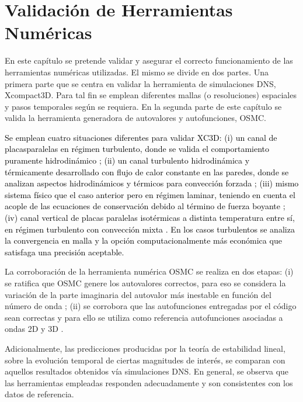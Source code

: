 \chapter{Validación de Herramientas Numéricas} \label{cap:validacion}


En este capítulo se pretende validar y asegurar el correcto funcionamiento de las \linebreak herramientas numéricas utilizadas. El mismo se divide en dos partes. Una primera parte que se centra en validar la herramienta de simulaciones DNS, Xcompact3D. Para tal fin se emplean diferentes mallas (o resoluciones) espaciales y pasos temporales según se requiera. En la segunda parte de este capítulo se valida la herramienta generadora de autovalores y autofunciones, OSMC. 

\textcolor{black}{Se emplean cuatro situaciones diferentes para validar XC3D: (i) un canal de placas\linebreak paralelas en régimen turbulento, donde se valida el comportamiento puramente hidrodinámico \cite{moser1999}; (ii) un canal turbulento hidrodinámica y térmicamente desarrollado con flujo de calor constante en las paredes, donde se analizan aspectos hidrodinámicos y térmicos para convección forzada \cite{kawamura2000dns}; (iii) mismo sistema físico que el caso anterior pero en régimen laminar, teniendo en cuenta el acople de las ecuaciones de conservación debido al término de fuerza boyante \cite{chen1996linear}; (iv) canal vertical de placas paralelas isotérmicas a distinta temperatura entre sí, en régimen  turbulento con convección mixta \cite{guo2022direct}. En los casos turbulentos se analiza la convergencia en malla y la opción computacionalmente más económica que satisfaga una precisión aceptable.}

La corroboración de la herramienta numérica OSMC se realiza en dos etapas: (i) se ratifica que OSMC genere los autovalores correctos, para eso se considera la variación de la parte \linebreak imaginaria del autovalor más inestable en función del número de onda \cite{chen1996linear}; (ii) se corrobora que las autofunciones entregadas por el código sean correctas y para ello se utiliza como referencia autofunciones asociadas a ondas 2D y 3D \cite{chen2003direct}.

Adicionalmente, las predicciones producidas por la teoría de estabilidad lineal, sobre la evolución temporal de ciertas magnitudes de interés, se comparan con aquellos resultados obtenidos vía simulaciones DNS. En general, se observa que las herramientas empleadas \linebreak responden adecuadamente y son consistentes con los datos de referencia.


